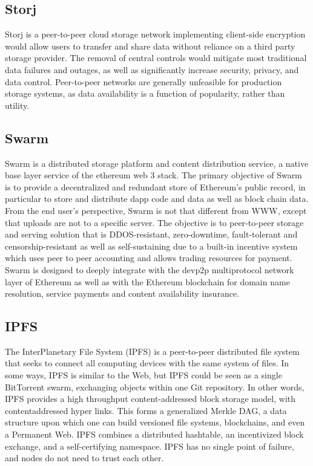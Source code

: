 \subsection*{Storj}
Storj is a peer-to-peer cloud storage network implementing client-side encryption would allow users to transfer and share data without reliance on a third party storage provider. The removal of central controls would mitigate most traditional data failures and outages, as well as significantly increase security, privacy, and data control. Peer-to-peer networks are generally unfeasible for production storage systems, as data availability is a function of popularity, rather than utility.
\subsection*{Swarm}
Swarm is a distributed storage platform and content distribution service, a native base layer service of the ethereum web 3 stack. The primary objective of Swarm is to provide a decentralized and redundant store of Ethereum's public record, in particular to store and distribute dapp code and data as well as block chain data.
From the end user's perspective, Swarm is not that different from WWW, except that uploads are not to a specific server. The objective is to peer-to-peer storage and serving solution that is DDOS-resistant, zero-downtime, fault-tolerant and censorship-resistant as well as self-sustaining due to a built-in incentive system which uses peer to peer accounting and allows trading resources for payment. Swarm is designed to deeply integrate with the devp2p multiprotocol network layer of Ethereum as well as with the Ethereum blockchain for domain name resolution, service payments and content availability insurance.
\subsection*{IPFS}
The InterPlanetary File System (IPFS) is a peer-to-peer distributed file system that seeks to connect all computing devices with the same system of files. In some ways, IPFS is similar to the Web, but IPFS could be seen as a single BitTorrent swarm, exchanging objects within one Git repository. In other words, IPFS provides a high throughput content-addressed block storage model, with contentaddressed hyper links. This forms a generalized Merkle DAG, a data structure upon which one can build versioned file systems, blockchains, and even a Permanent Web. IPFS combines a distributed hashtable, an incentivized block exchange, and a self-certifying namespace. IPFS has no single point of failure, and nodes do not need to trust each other.
